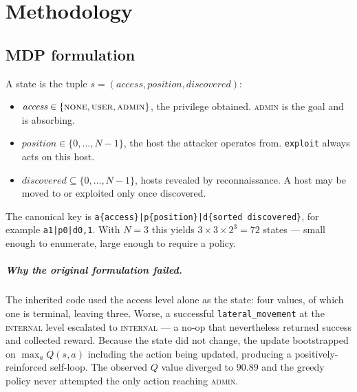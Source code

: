 \documentclass[11pt,a4paper]{report}
\newcommand{\code}[1]{\texttt{\small #1}}
\begin{document}
\chapter{Methodology}
\label{ch:method}

\section{MDP formulation}
A state is the tuple $s = (\textit{access}, \textit{position}, \textit{discovered})$:

\begin{itemize}[leftmargin=*]
  \item $\textit{access} \in \{\textsc{none}, \textsc{user}, \textsc{admin}\}$,
  the privilege obtained. \textsc{admin} is the goal and is absorbing.
  \item $\textit{position} \in \{0,\dots,N-1\}$, the host the attacker operates
  from. \code{exploit} always acts on this host.
  \item $\textit{discovered} \subseteq \{0,\dots,N-1\}$, hosts revealed by
  reconnaissance. A host may be moved to or exploited only once discovered.
\end{itemize}

The canonical key is \code{a\{access\}|p\{position\}|d\{sorted discovered\}}, for
example \code{a1|p0|d0,1}. With $N=3$ this yields $3 \times 3 \times 2^3 = 72$
states --- small enough to enumerate, large enough to require a policy.

\paragraph{Why the original formulation failed.} The inherited code used the
access level alone as the state: four values, of which one is terminal, leaving
three. Worse, a successful \code{lateral\_movement} at the \textsc{internal}
level escalated to \textsc{internal} --- a no-op that nevertheless returned
success and collected reward. Because the state did not change, the update
bootstrapped on $\max_a Q(s,a)$ including the action being updated, producing a
positively-reinforced self-loop. The observed $Q$ value diverged to $90.89$ and
the greedy policy never attempted the only action reaching \textsc{admin}.
\end{document}
